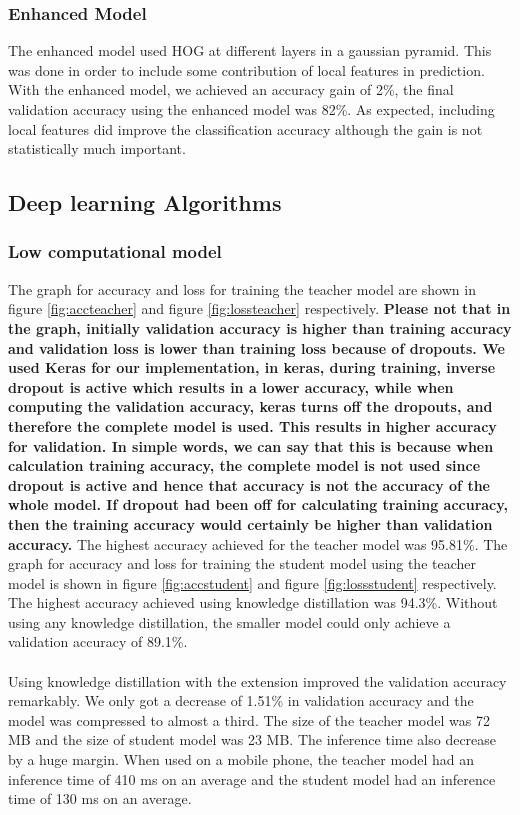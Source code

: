 \documentclass[extendedabs]{bmvc2k}
\begin{document}
\subsubsection{Enhanced Model}
The enhanced model used HOG at different layers in a gaussian pyramid. This was done in order to include some contribution of local features in prediction. With the enhanced model, we achieved an accuracy gain of 2\%, the final validation accuracy using the enhanced model was 82\%. As expected, including local features did improve the classification accuracy although the gain is not statistically much important.

\subsection{Deep learning Algorithms}
\subsubsection{Low computational model}
The graph for accuracy and loss for training the teacher model are shown in figure \ref{fig:accteacher} and figure \ref{fig:lossteacher} respectively. \textbf{Please not that in the graph, initially validation accuracy is higher than training accuracy and validation loss is lower than training loss because of dropouts. We used Keras \cite{chollet2015keras} for our implementation, in keras, during training, inverse dropout is active which results in a lower accuracy, while when computing the validation accuracy, keras turns off the dropouts, and therefore the complete model is used. This results in higher accuracy for validation. In simple words, we can say that this is because when calculation training accuracy, the complete model is not used since dropout is active and hence that accuracy is not the accuracy of the whole model. If dropout had been off for calculating training accuracy, then the training accuracy would certainly be higher than validation accuracy.} The highest accuracy achieved for the teacher model was 95.81\%. The graph for accuracy and loss for training the student model using the teacher model is shown in figure \ref{fig:accstudent} and figure \ref{fig:lossstudent} respectively. The highest accuracy achieved using knowledge distillation was 94.3\%. Without using any knowledge distillation, the smaller model could only achieve a validation accuracy of 89.1\%.\\\\
Using knowledge distillation with the extension improved the validation accuracy remarkably. We only got a decrease of 1.51\% in validation accuracy and the model was compressed to almost a third. The size of the teacher model was 72 MB and the size of student model was 23 MB. The inference time also decrease by a huge margin. When used on a mobile phone, the teacher model had an inference time of 410 ms on an average and the student model had an inference time of 130 ms on an average.
\end{document}
